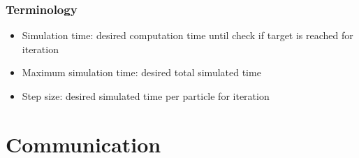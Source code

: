 \newpage
%
%

\subsubsection{Terminology}
\begin{itemize}[noitemsep,topsep=0pt]
\item Simulation time: desired computation time until check if target is reached for iteration
\item Maximum simulation time: desired total simulated time
\item Step size: desired simulated time per particle for iteration
\end{itemize}

\section{Communication}

